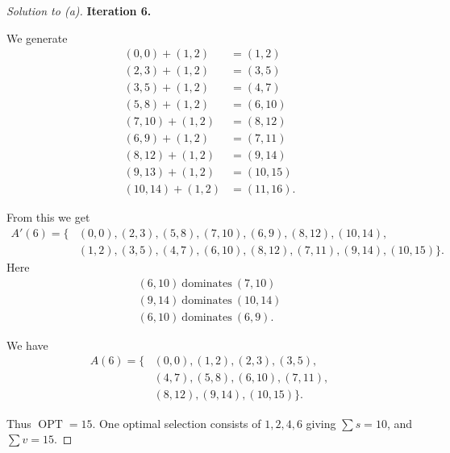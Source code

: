\documentclass[11pt]{article}
\begin{document}
\begin{proof}[Solution to (a)]
    \textbf{Iteration 6.}

    We generate 
    \[
        \begin{aligned}
            (0,0) + (1,2) &= (1,2) \\ 
            (2,3) + (1,2) &= (3,5) \\ 
            (3,5) + (1,2) &= (4,7) \\ 
            (5,8) + (1,2) &= (6,10) \\ 
            (7,10) + (1,2) &= (8,12) \\ 
            (6,9) + (1,2) &= (7,11) \\ 
            (8,12) + (1,2) &= (9,14) \\ 
            (9,13) + (1,2) &= (10,15) \\ 
            (10,14) + (1,2) &= (11,16).
        \end{aligned}
    \]

    From this we get 
    \[
        \begin{aligned}
            A'(6) 
            = \{&(0,0),(2,3),(5,8),(7,10), 
            (6,9),(8,12),(10,14), \\ 
            &(1,2),(3,5),(4,7),(6,10),(8,12),(7,11),(9,14), 
            (10,15) 
            \}.
        \end{aligned}
    \]
    Here 
    \[
        \begin{aligned}
            (6,10) \ \text{dominates} \ (7,10) \\ 
            (9,14) \ \text{dominates} \ (10,14) \\ 
            (6,10) \ \text{dominates} \ (6,9). 
        \end{aligned}
    \]

    We have 
    \[
        \begin{aligned}
        A(6)=\{&
        (0,0),(1,2),(2,3),(3,5),\\
        &(4,7),(5,8),(6,10),(7,11),\\
        &(8,12),(9,14),(10,15)\}.
        \end{aligned}
    \]

    Thus $\operatorname{OPT} = 15$. One optimal 
    selection consists of $1,2,4,6$ giving 
    $\sum s = 10$, and $\sum v = 15$. 
\end{proof}
\end{document}

